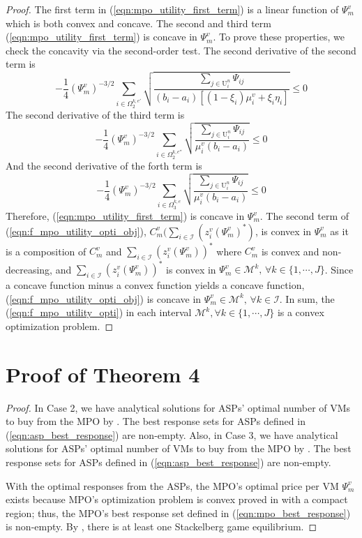 \documentclass[10pt,journal, compsoc]{IEEEtran}
\begin{document}
\begin{proof}
    
    The first term in (\ref{eqn:mpo_utility_first_term}) is a linear function of $\Psi_m^v$ which is both convex and concave. The second and third term (\ref{eqn:mpo_utility_first_term}) is concave in $\Psi_m^v$. To prove these properties, we check the concavity via the second-order test. The second derivative of the second term is
    \begin{equation}
    -\frac{1}{4}(\Psi_m^v)^{-3/2}\sum_{i \in \Omega_2^{k,e'}} \sqrt{\frac{\sum_{j \in \mathrm{U}_i^n}\Psi_{ij}}{(b_i-a_i)[(1-\xi_i)\mu_i^v + \xi_i \eta_i]}} \leq 0
    \end{equation}
    The second derivative of the third term is
    \begin{equation}
    -\frac{1}{4}(\Psi_m^v)^{-3/2}\sum_{i \in \Omega_2^{k,e''}} \sqrt{\frac{\sum_{j \in \mathrm{U}_i^n}\Psi_{ij}}{\mu_i^v(b_i-a_i)}} \leq 0
    \end{equation}
    And the second derivative of the forth term is
    \begin{equation}
    -\frac{1}{4}(\Psi_m^v)^{-3/2}\sum_{i \in \Omega_3^{k,e}} \sqrt{\frac{\sum_{j \in \mathrm{U}_i^n}\Psi_{ij}}{\mu_i^v(b_i-a_i)}} \leq 0
    \end{equation}
    Therefore, (\ref{eqn:mpo_utility_first_term}) is concave in $\Psi_m^v$. The second term of (\ref{eqn:f_mpo_utility_opti_obj}), $C_m^v\big(\sum_{i \in \mathcal{I}} (z_{i}^v(\Psi_m^v)^*)$, is convex in $\Psi_m^v$ as it is a composition of $C_m^v$ and $\sum_{i \in \mathcal{I}} (z_{i}^v(\Psi_m^v))^*$ where $C_m^v$ is convex and non-decreasing, and $\sum_{i \in \mathcal{I}} (z_{i}^v(\Psi_m^v))^*$ is convex in $\Psi_m^v \in \mathcal{M}^k,\, \forall k \in \{1, \cdots, J\}$. Since a concave function minus a convex function yields a concave function, (\ref{eqn:f_mpo_utility_opti_obj}) is concave in $\Psi_m^v \in \mathcal{M}^k,\, \forall k \in \mathcal{I}$. In sum, the (\ref{eqn:f_mpo_utility_opti}) in each interval $\mathcal{M}^k, \forall k \in \{1, \cdots, J\}$ is a convex optimization problem. \qedhere
    \end{proof}
  \section{Proof of Theorem 4}\label{appendix:theorem_4}
    \begin{proof}
    In Case 2, we have analytical solutions for ASPs' optimal number of VMs to buy from the MPO by . The best response sets for ASPs defined in (\ref{eqn:asp_best_response}) are non-empty. Also, in Case 3, we have analytical solutions for ASPs' optimal number of VMs to buy from the MPO by . The best response sets for ASPs defined in (\ref{eqn:asp_best_response}) are non-empty. 
    
    With the optimal responses from the ASPs, the MPO's optimal price per VM $\Psi_m^v$ exists because MPO's optimization problem is convex proved in  with a compact region; thus, the MPO's best response set defined in (\ref{eqn:mpo_best_response}) is non-empty. By , there is at least one Stackelberg game equilibrium.
    \end{proof}
\end{document}
